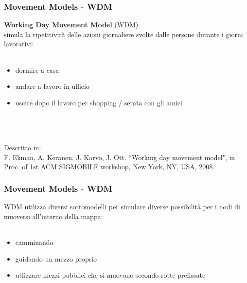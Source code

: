 \documentclass{beamer}
\begin{document}
\begin{frame}
\frametitle{Movement Models - WDM}
\label{WDM}
\textbf{Working Day Movement Model} (WDM)\\
simula la ripetitività delle azioni giornaliere svolte dalle persone durante i giorni lavorativi:
\ \\
\ \\
\begin{itemize}
\item dormire a casa
\item andare a lavoro in ufficio
\item uscire dopo il lavoro per shopping / serata con gli amici
\end{itemize}
\ \\
\ \\
\ \\
Descritto in: \\
{\footnotesize F. Ekman, A. Ker\"{a}nen, J. Karvo, J. Ott. ``Working day movement model", in Proc. of 1st ACM SIGMOBILE workshop, New York, NY, USA, 2008. }
\end{frame}

\begin{frame}
\frametitle{Movement Models - WDM}
WDM utilizza diversi sottomodelli per simulare diverse possibilità per i nodi di muoversi all'interno della mappa:
\ \\
\ \\
\begin{itemize}
\item camminando
\item guidando un mezzo proprio
\item utlizzare mezzi pubblici che si muovono secondo rotte prefissate
\end{itemize}
\end{frame}
\end{document}

